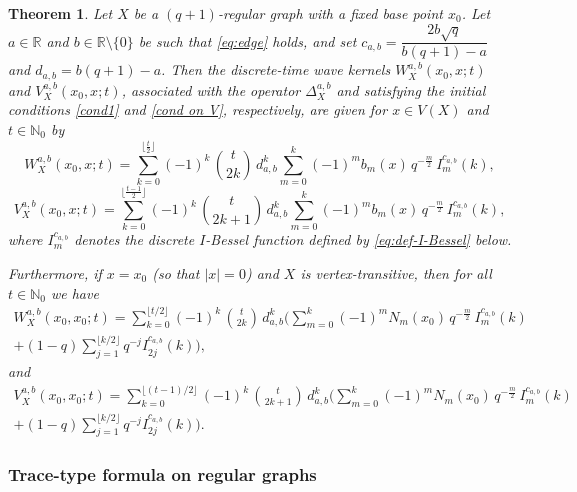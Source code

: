 \documentclass[reqno,10pt]{amsart}
\newtheorem{theorem}{Theorem}[section]
\theoremstyle{definition}
\numberwithin{equation}{section}
\begin{document}
\begin{theorem}\label{wavegraph}
Let $X$ be a $(q+1)$-regular graph with a fixed base point $x_0$. Let $a\in\mathbb{R}$ and $b\in\mathbb R \setminus \{0\}$ be such that \eqref{eq:edge} holds, and set $c_{a,b} = \dfrac{2b\sqrt{q}}{b(q+1) - a}$ and $d_{a,b}=b(q+1)-a$.
Then the discrete-time wave kernels $W_X^{a,b}(x_0, x; t)$ and $V_X^{a,b}(x_0, x; t)$, associated with the operator $\Delta_X^{a,b}$ and satisfying the initial conditions \eqref{cond1} and \eqref{cond on V}, respectively, are given for $x \in V(X)$ and $t \in \mathbb{N}_0$ by
\begin{equation}\label{eq:universal_cover}
 W_X^{a,b}(x_0, x; t) =
    \sum_{k=0}^{\lfloor \tfrac{t}{2} \rfloor}
    (-1)^{k} \,\binom{t}{2k} \, d_{a,b}^k
    \sum_{m=0}^{k} (-1)^{m} b_m(x) \, q^{-\tfrac{m}{2}} \, I_{m}^{c_{a,b}}(k),
\end{equation}
\begin{equation}\label{eq:universal_cover V}
    V_X^{a,b}(x_0, x; t) =
    \sum_{k=0}^{\lfloor \tfrac{t-1}{2} \rfloor}
    (-1)^{k} \,\binom{t}{2k+1} \, d_{a,b}^k
    \sum_{m=0}^{k}(-1)^{m} b_m(x) \, q^{-\tfrac{m}{2}} \, I_{m}^{c_{a,b}}(k),
\end{equation}
where $I_{m}^{c_{a,b}}$ denotes the discrete $I$-Bessel function defined by \eqref{eq:def-I-Bessel} below.

Furthermore, if $x = x_0$ (so that $|x|=0$) and $X$ is vertex-transitive, then for all $t \in \mathbb{N}_0$ we have
\begin{multline}\label{eq:universal_cover_a}
        W_X^{a,b}(x_0, x_0; t) =
    \sum_{k=0}^{\lfloor t/2\rfloor}
    (-1)^{k} \,\binom{t}{2k} \, d_{a,b}^k
    \bigg( \sum_{m=0}^{k} (-1)^m N_m(x_0) \, q^{-\frac{m}{2}} \, I_{m}^{c_{a,b}}(k)
    \\+ (1-q) \sum_{j=1}^{\lfloor k/2 \rfloor} q^{-j} I_{2j}^{c_{a,b}}(k) \bigg),
\end{multline}
and
\begin{multline}\label{eq:universal_cover_a V}
    V_X^{a,b}(x_0, x_0; t) =
    \sum_{k=0}^{\lfloor (t-1)/2 \rfloor}
    (-1)^{k} \,\binom{t}{2k+1} \, d_{a,b}^k
    \bigg( \sum_{m=0}^{k} (-1)^m N_m(x_0) \, q^{-\tfrac{m}{2}} \, I_{m}^{c_{a,b}}(k)
    \\ +(1-q) \sum_{j=1}^{\lfloor k/2 \rfloor} q^{-j} I_{2j}^{c_{a,b}}(k) \bigg).
\end{multline}
\end{theorem}

\subsubsection{Trace-type formula on regular graphs}
\end{document}
